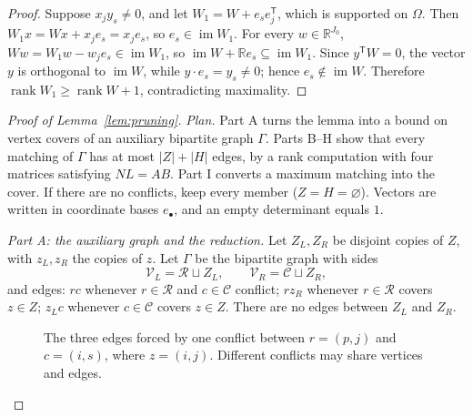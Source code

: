 \documentclass[11pt]{article}
\theoremstyle{remark}
\newcommand{\abs}[1]{\lvert #1\rvert}
\DeclareMathOperator{\rank}{rank}
\DeclareMathOperator{\im}{im}
\newcommand{\R}{\mathbb R}
\begin{document}
\begin{proof}
Suppose $x_jy_s\ne0$, and let $W_1=W+e_se_j^{\mathsf T}$, which is supported
on $\Omega$.  Then $W_1x=Wx+x_je_s=x_je_s$, so $e_s\in\im W_1$.  For every
$w\in\R^{J_0}$, $Ww=W_1w-w_je_s\in\im W_1$, so $\im W+\R e_s\subseteq\im W_1$.
Since $y^{\mathsf T}W=0$, the vector $y$ is orthogonal to $\im W$, while
$y\cdot e_s=y_s\ne0$; hence $e_s\notin\im W$.  Therefore
$\rank W_1\ge\rank W+1$, contradicting maximality.
\end{proof}

\begin{proof}[Proof of Lemma~\ref{lem:pruning}]
\emph{Plan.}  Part A turns the lemma into a bound on vertex covers of an
auxiliary bipartite graph $\Gamma$.  Parts B--H show that every matching of
$\Gamma$ has at most $\abs Z+\abs H$ edges, by a rank computation with four
matrices satisfying $NL=AB$.  Part I converts a maximum matching into the
cover.  If there are no conflicts, keep every member ($Z=H=\varnothing$).
Vectors are written in coordinate bases $e_\bullet$, and an empty
determinant equals $1$.

\medskip\noindent
\emph{Part A: the auxiliary graph and the reduction.}
Let $Z_L,Z_R$ be disjoint copies of $Z$, with $z_L,z_R$ the copies of $z$.
Let $\Gamma$ be the bipartite graph with sides
\[
 \mathcal V_L=\mathcal R\sqcup Z_L,
 \qquad
 \mathcal V_R=\mathcal C\sqcup Z_R,
\]
and edges: $rc$ whenever $r\in\mathcal R$ and $c\in\mathcal C$ conflict;
$rz_R$ whenever $r\in\mathcal R$ covers $z\in Z$; $z_Lc$ whenever
$c\in\mathcal C$ covers $z\in Z$.  There are no edges between $Z_L$ and
$Z_R$.

\begin{figure}[!ht]
 \centering
 \caption{The three edges forced by one conflict between $r=(p,j)$ and
 $c=(i,s)$, where $z=(i,j)$.  Different conflicts may share vertices and
 edges.}
 \label{fig:pruning}
\end{figure}


\end{proof}
\end{document}
